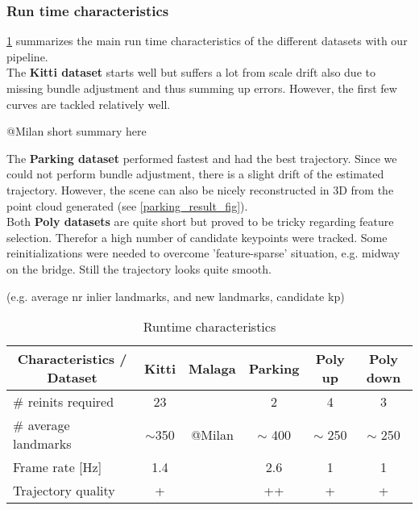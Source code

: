 \subsubsection{Run time characteristics}
\cref{runtime_table} summarizes the main run time characteristics of the different datasets with our pipeline.\\

The \textbf{Kitti dataset} starts well but suffers a lot from scale drift also due to missing bundle adjustment and thus summing up errors. However, the first few curves are tackled relatively well.

\textcolor[rgb]{0,0,0}{\colorbox[rgb]{1,0,0}{@Milan short summary here}}

The \textbf{Parking dataset} performed fastest and had the best trajectory. Since we could not perform bundle adjustment, there is a slight drift of the estimated trajectory. However, the scene can also be nicely reconstructed in 3D from the point cloud generated (see \cref{parking_result_fig}).\\

Both \textbf{Poly datasets} are quite short but proved to be tricky regarding feature selection. Therefor a high number of candidate keypoints were tracked. Some reinitializations were needed to overcome 'feature-sparse' situation, e.g. midway on the bridge. Still the trajectory looks quite smooth.

(e.g. average nr inlier landmarks, and new landmarks, candidate kp)
\begin{table}[h!!]
	\centering
	\begin{tabular}{|l|c|c|c|c|c|}
	\hline
	\multicolumn{1}{|c|}{\textbf{Characteristics / Dataset}} & \textbf{Kitti} & \textbf{Malaga} & \textbf{Parking} & \textbf{Poly up} & \textbf{Poly down} \\ \hline
	\# reinits required                                      & 23             &                 & 2                & 4 & 3  \\ \hline
	\# average landmarks                                     & $\sim$350      &  @Milan         & $\sim$ 400       & $\sim$ 250 & $\sim$ 250 \\ \hline
	Frame rate {[}Hz{]}                                      & 1.4            &                 & 2.6              & 1 & 1 \\ \hline
	Trajectory quality                                       & +              &                 & ++               & + & + \\ \hline
	\end{tabular}
	\caption{Runtime characteristics}
	\label{runtime_table}
\end{table}

